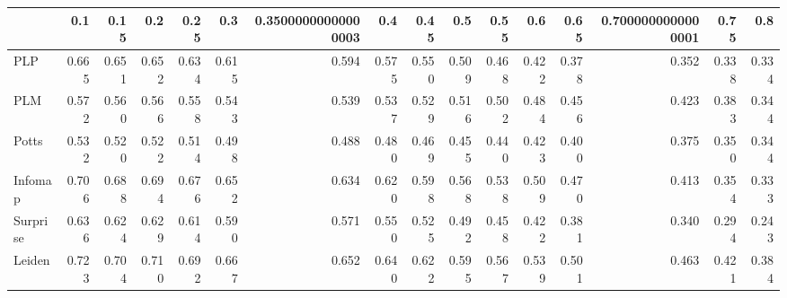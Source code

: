 \begin{tabular}{lrrrrrrrrrrrrrrr}
\toprule
{} &   0.1 &  0.15 &   0.2 &  0.25 &   0.3 & 0.35000000000000003 &   0.4 &  0.45 &   0.5 &  0.55 &   0.6 &  0.65 & 0.7000000000000001 &  0.75 &   0.8 \\
\midrule
PLP      & 0.665 & 0.651 & 0.652 & 0.634 & 0.615 &               0.594 & 0.575 & 0.550 & 0.509 & 0.468 & 0.422 & 0.378 &              0.352 & 0.338 & 0.334 \\
PLM      & 0.572 & 0.560 & 0.566 & 0.558 & 0.543 &               0.539 & 0.537 & 0.529 & 0.516 & 0.502 & 0.484 & 0.456 &              0.423 & 0.383 & 0.344 \\
Potts    & 0.532 & 0.520 & 0.522 & 0.514 & 0.498 &               0.488 & 0.480 & 0.469 & 0.455 & 0.440 & 0.423 & 0.400 &              0.375 & 0.350 & 0.344 \\
Infomap  & 0.706 & 0.688 & 0.694 & 0.676 & 0.652 &               0.634 & 0.620 & 0.598 & 0.568 & 0.538 & 0.509 & 0.470 &              0.413 & 0.354 & 0.333 \\
Surprise & 0.636 & 0.624 & 0.629 & 0.614 & 0.590 &               0.571 & 0.550 & 0.525 & 0.492 & 0.458 & 0.422 & 0.381 &              0.340 & 0.294 & 0.243 \\
Leiden   & 0.723 & 0.704 & 0.710 & 0.692 & 0.667 &               0.652 & 0.640 & 0.622 & 0.595 & 0.567 & 0.539 & 0.501 &              0.463 & 0.421 & 0.384 \\
\bottomrule
\end{tabular}
